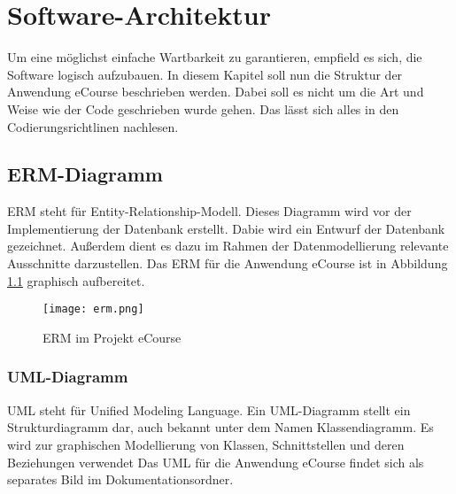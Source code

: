 \chapter{Software-Architektur}

Um eine möglichst einfache Wartbarkeit zu garantieren, empfield es sich, die Software logisch aufzubauen. In diesem Kapitel soll nun die Struktur der Anwendung eCourse beschrieben werden. Dabei soll es nicht um die Art und Weise wie der Code geschrieben wurde gehen. Das lässt sich alles in den Codierungsrichtlinen nachlesen.

\section{ERM-Diagramm}
ERM steht für Entity-Relationship-Modell. Dieses Diagramm wird vor der Implementierung der Datenbank erstellt. Dabie wird ein Entwurf der Datenbank gezeichnet. Außerdem dient es dazu im Rahmen der Datenmodellierung relevante Ausschnitte darzustellen. Das ERM für die Anwendung eCourse ist in Abbildung \ref{fib:erm} graphisch aufbereitet.

\begin{figure}[H]
\centering
\texttt{[image: erm.png]}
\caption{ERM im Projekt eCourse}
\label{fib:erm}
\end{figure}

\subsection{UML-Diagramm}
UML steht für Unified Modeling Language. Ein UML-Diagramm stellt ein Strukturdiagramm dar, auch bekannt unter dem Namen Klassendiagramm. Es wird zur graphischen Modellierung von Klassen, Schnittstellen und deren Beziehungen verwendet \newline
Das UML für die Anwendung eCourse findet sich als separates Bild im Dokumentationsordner.